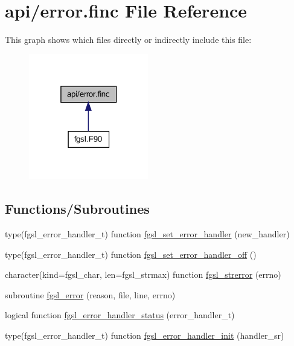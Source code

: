 \hypertarget{error_8finc}{}\section{api/error.finc File Reference}
\label{error_8finc}
This graph shows which files directly or indirectly include this file\+:\nopagebreak
\begin{figure}[H]
\begin{center}
\leavevmode
\includegraphics[width=148pt]{error_8finc__dep__incl}
\end{center}
\end{figure}
\subsection*{Functions/\+Subroutines}
\begin{DoxyCompactItemize}
\item 
type(fgsl\+\_\+error\+\_\+handler\+\_\+t) function \hyperlink{error_8finc_a0bcea44cb57ec40ff8ee5deb56628d6c}{fgsl\+\_\+set\+\_\+error\+\_\+handler} (new\+\_\+handler)
\item 
type(fgsl\+\_\+error\+\_\+handler\+\_\+t) function \hyperlink{error_8finc_a038022a5ae74d2221231fb2d484e3fb9}{fgsl\+\_\+set\+\_\+error\+\_\+handler\+\_\+off} ()
\item 
character(kind=fgsl\+\_\+char, len=fgsl\+\_\+strmax) function \hyperlink{error_8finc_afb379d7136f115fcbc5fbe6178ab1a8b}{fgsl\+\_\+strerror} (errno)
\item 
subroutine \hyperlink{error_8finc_a4d5b557021a59a337ae0a724da2f2f79}{fgsl\+\_\+error} (reason, file, line, errno)
\item 
logical function \hyperlink{error_8finc_aa355a6ea584a0315b6bd48125143f61e}{fgsl\+\_\+error\+\_\+handler\+\_\+status} (error\+\_\+handler\+\_\+t)
\item 
type(fgsl\+\_\+error\+\_\+handler\+\_\+t) function \hyperlink{error_8finc_a2021475812bde99b19e3497120fe502f}{fgsl\+\_\+error\+\_\+handler\+\_\+init} (handler\+\_\+sr)
\end{DoxyCompactItemize}


